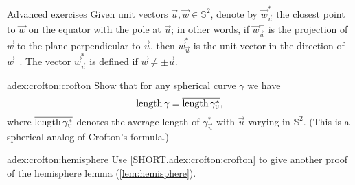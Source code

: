 \begin{thm}{Advanced exercises} \label{adex:crofton}
Given unit vectors ${\vec u},{\vec w}\in\mathbb{S}^2$, denote by ${\vec w}^*_{\vec u}$ the closest point to ${\vec w}$ on the equator with the pole at ${\vec u}$;
in other words, if ${\vec w}^\perp_{\vec u}$ is the projection of ${\vec w}$ to the plane perpendicular to ${\vec u}$, then ${\vec w}^*_{\vec u}$ is the unit vector in the direction of ${\vec w}^\perp$.
The vector ${\vec w}^*_{\vec u}$ is defined if ${\vec w}\ne\pm {\vec u}$.

\begin{subthm}{adex:crofton:crofton}
Show that for any spherical curve $\gamma$ we have
\[\mathop{\rm length}\nolimits\gamma=\overline{\mathop{\rm length}\nolimits\gamma^*_{\text{\sc{u}}}},\]
where $\overline{\mathop{\rm length}\nolimits\gamma^*_{\text{\sc{u}}}}$ denotes the average length of $\gamma^*_{\vec u}$ with ${\vec u}$ varying in $\mathbb{S}^2$.
(This is a spherical analog of Crofton's formula.)
\end{subthm}

\begin{subthm}{adex:crofton:hemisphere}
Use \ref{SHORT.adex:crofton:crofton} to give another proof of the hemisphere lemma (\ref{lem:hemisphere}). 
\end{subthm}
 
\end{thm}

